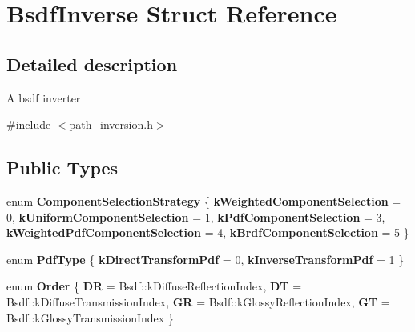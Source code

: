 \hypertarget{struct_bsdf_inverse}{}\section{Bsdf\+Inverse Struct Reference}
\label{struct_bsdf_inverse}


\subsection{Detailed description}
A bsdf inverter 

{\ttfamily \#include $<$path\+\_\+inversion.\+h$>$}

\subsection*{Public Types}
\begin{DoxyCompactItemize}
\item 
\mbox{\label{struct_bsdf_inverse_abda5691f28fa1c181ab7be7ef63f1cd3}} 
enum {\bfseries Component\+Selection\+Strategy} \{ \newline
{\bfseries k\+Weighted\+Component\+Selection} = 0, 
{\bfseries k\+Uniform\+Component\+Selection} = 1, 
{\bfseries k\+Pdf\+Component\+Selection} = 3, 
{\bfseries k\+Weighted\+Pdf\+Component\+Selection} = 4, 
\newline
{\bfseries k\+Brdf\+Component\+Selection} = 5
 \}
\item 
\mbox{\label{struct_bsdf_inverse_a40413bf752e595596da56c6c3e3368b0}} 
enum {\bfseries Pdf\+Type} \{ {\bfseries k\+Direct\+Transform\+Pdf} = 0, 
{\bfseries k\+Inverse\+Transform\+Pdf} = 1
 \}
\item 
\mbox{\label{struct_bsdf_inverse_a0bc1cfb21d55aada21eb4f57b142da50}} 
enum {\bfseries Order} \{ {\bfseries DR} = Bsdf\+:\+:k\+Diffuse\+Reflection\+Index, 
{\bfseries DT} = Bsdf\+:\+:k\+Diffuse\+Transmission\+Index, 
{\bfseries GR} = Bsdf\+:\+:k\+Glossy\+Reflection\+Index, 
{\bfseries GT} = Bsdf\+:\+:k\+Glossy\+Transmission\+Index
 \}
\end{DoxyCompactItemize}

